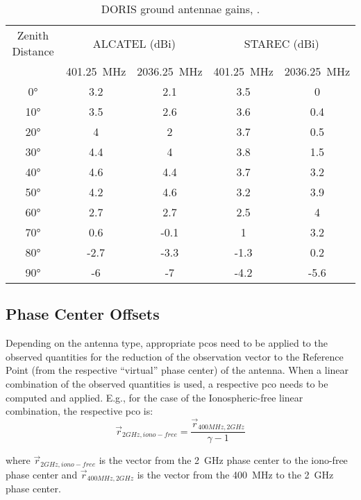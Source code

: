 \begin{table}[h!]
    \centering
    \begin{tabular}{|c | c | c | c | c|}
        \hline
        Zenith Distance & \multicolumn{2}{c}{ALCATEL (dBi)} & \multicolumn{2}{c|}{STAREC (dBi)} \\
                        & \SI{401.25}{\mega\hertz} & \SI{2036.25}{\mega\hertz} &  \SI{401.25}{\mega\hertz} & \SI{2036.25}{\mega\hertz}\\
        \hline
        \ang{0}&3.2&2.1&3.5&0 \\
        \ang{10}&3.5&2.6&3.6&0.4\\
        \ang{20}&4&2&3.7&0.5\\
        \ang{30}&4.4&4&3.8&1.5\\
        \ang{40}&4.6&4.4&3.7&3.2\\
        \ang{50}&4.2&4.6&3.2&3.9\\
        \ang{60}&2.7&2.7&2.5&4\\
        \ang{70}&0.6&-0.1&1&3.2\\
        \ang{80}&-2.7&-3.3&-1.3&0.2\\
        \ang{90}&-6&-7&-4.2&-5.6\\
        \hline
    \end{tabular}
    \caption{DORIS ground antennae gains, \cite{DORISGSM}.}
    \label{table:antenna-gains}
\end{table}

\subsection{Phase Center Offsets}

Depending on the antenna type, appropriate \gls{pco}s need to be applied to 
the observed quantities for the reduction of the observation vector to the Reference Point 
(from the respective ``virtual'' phase center) of the antenna. When a linear combination 
of the observed quantities is used, a respective \gls{pco} needs to be computed and 
applied. E.g., for the case of the Ionospheric-free linear combination, the respective 
\gls{pco} is:
\begin{equation}
    \vec{r}_{2GHz,iono-free} = \frac{\vec{r}_{400MHz,2GHz}}{\gamma - 1}
\end{equation}

where $\vec{r}_{2GHz,iono-free}$ is the vector from the \SI{2}{\GHz} phase
center to the iono-free phase center and $\vec{r}_{400MHz,2GHz}$ is
the vector from the \SI{400}{MHz} to the \SI{2}{\GHz} phase center.

